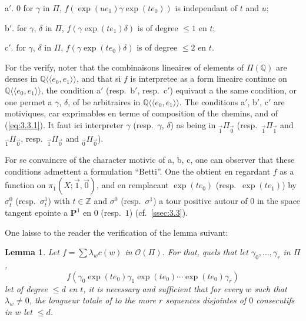 \documentclass[11pt,a4paper]{article}
\theoremstyle{plain}
\newtheorem{lemma}[theorem]{Lemma}
\theoremstyle{definition}
\newcommand{\Z}{\mathbb{Z}}
\newcommand{\Q}{\mathbb{Q}}
\begin{document}
a$'$. $0$ for $\gamma$ in $\Pi$, $f(\exp(u e_1) \gamma \exp(t e_0))$ is independant of $t$ and $u$;

b$'$. for $\gamma$, $\delta$ in $\Pi$, $f(\gamma \exp(t e_1) \delta)$ is of degree $\leq 1$ en $t$;

c$'$. for $\gamma$, $\delta$ in $\Pi$, $f(\gamma \exp(t e_0) \delta)$ is of degree $\leq 2$ en $t$.

For the verify, noter that the combinaisons lineaires of elements of $\Pi(\Q)$ are denses in $\Q\langle\langle e_0,e_1 \rangle\rangle$, and that si $f$ is interpretee as a form lineaire continue on $\Q\langle\langle e_0,e_1 \rangle\rangle$, the condition a$'$ (resp.~b$'$, resp.~c$'$) equivaut a the same condition, or one permet a $\gamma$, $\delta$, of be arbitraires in $\Q\langle\langle e_0,e_1 \rangle\rangle$. The conditions a$'$, b$'$, c$'$ are motiviques, car exprimables en terme of composition of the chemins, and of (\ref{eq:3.3.1}). It faut ici interpreter $\gamma$ (resp.~$\gamma$, $\delta$) as being in ${}_{\vec{1}}\Pi_{\vec{0}}$ (resp.~${}_{\vec{1}}\Pi_{\vec{1}}$ and ${}_{\vec{1}}\Pi_{\vec{0}}$, resp.~${}_{\vec{1}}\Pi_{\vec{0}}$ and ${}_{\vec{0}}\Pi_{\vec{0}}$).

For se convaincre of the character motivic of a, b, c, one can observer that these conditions admettent a formulation ``Betti''. One the obtient en regardant $f$ as a function on $\pi_1(X;\vec{1},\vec{0})$, and en remplacant $\exp(t e_0)$ (resp.~$\exp(t e_1)$) by $\sigma_t^0$ (resp.~$\sigma_t^1$) with $t \in \Z$ and $\sigma^0$ (resp.~$\sigma^1$) a tour positive autour of $0$ in the space tangent epointe a $\mathbf{P}^1$ en $0$ (resp.~$1$) (cf.~\ref{ssec:3.3}).

One laisse to the reader the verification of the lemma suivant:

\begin{lemma}\label{lem:6.4}
Let $f = \sum \lambda_w c(w)$ in $\mathcal{O}(\Pi)$. For that, quels that let $\gamma_0,\ldots,\gamma_r$ in $\Pi$,
\begin{equation}\label{eq:6.4.1}
f(\gamma_0 \exp(t e_0) \gamma_1 \exp(t e_0) \cdots \exp(t e_0) \gamma_r)
\end{equation}
let of degree $\leq d$ en $t$, it is necessary and sufficient that for every $w$ such that $\lambda_w \neq 0$, the longueur totale of to the more $r$ sequences disjointes of $0$ consecutifs in $w$ let $\leq d$.
\end{lemma}

\subsection{}\label{ssec:6.5}
\end{document}
